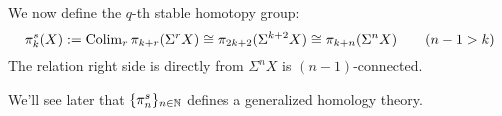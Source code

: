     \begin{defn}
        We now define the $q$-th stable homotopy group:
        $$
        \pi^s_k(X) := \operatorname{Colim}_{r} \pi_{k+r} (\Sigma^r X) \cong \pi_{2k+2} (\Sigma^{k+2} X) \cong \pi_{k+n} (\Sigma^{n} X) \quad \quad (n-1 > k)
        $$
        The relation right side is directly from $\Sigma^n X$ is $(n-1)$-connected.
    \end{defn}

    \begin{note}
        We'll see later that $\{\pi^s_n\}_{n \in \mathbb N}$ defines a
        generalized homology theory.
    \end{note}

